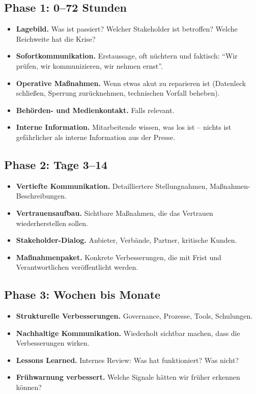\documentclass[11pt,a4paper,oneside]{article}
\begin{document}
\subsection{Phase 1: 0--72 Stunden}

\begin{itemize}
  \item \textbf{Lagebild.} Was ist passiert? Welcher Stakeholder ist betroffen? Welche Reichweite hat die Krise?
  \item \textbf{Sofortkommunikation.} Erstaussage, oft nüchtern und faktisch: ``Wir prüfen, wir kommunizieren, wir nehmen ernst''.
  \item \textbf{Operative Maßnahmen.} Wenn etwas akut zu reparieren ist (Datenleck schließen, Sperrung zurücknehmen, technischen Vorfall beheben).
  \item \textbf{Behörden- und Medienkontakt.} Falls relevant.
  \item \textbf{Interne Information.} Mitarbeitende wissen, was los ist -- nichts ist gefährlicher als interne Information aus der Presse.
\end{itemize}

\subsection{Phase 2: Tage 3--14}

\begin{itemize}
  \item \textbf{Vertiefte Kommunikation.} Detailliertere Stellungnahmen, Maßnahmen-Beschreibungen.
  \item \textbf{Vertrauensaufbau.} Sichtbare Maßnahmen, die das Vertrauen wiederherstellen sollen.
  \item \textbf{Stakeholder-Dialog.} Anbieter, Verbände, Partner, kritische Kunden.
  \item \textbf{Maßnahmenpaket.} Konkrete Verbesserungen, die mit Frist und Verantwortlichen veröffentlicht werden.
\end{itemize}

\subsection{Phase 3: Wochen bis Monate}

\begin{itemize}
  \item \textbf{Strukturelle Verbesserungen.} Governance, Prozesse, Tools, Schulungen.
  \item \textbf{Nachhaltige Kommunikation.} Wiederholt sichtbar machen, dass die Verbesserungen wirken.
  \item \textbf{Lessons Learned.} Internes Review: Was hat funktioniert? Was nicht?
  \item \textbf{Frühwarnung verbessert.} Welche Signale hätten wir früher erkennen können?
\end{itemize}
\end{document}
